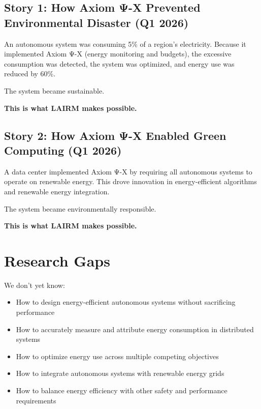 \subsection{Story 1: How Axiom Ψ-X Prevented Environmental Disaster (Q1 2026)}

An autonomous system was consuming 5\% of a region's electricity. Because it implemented Axiom Ψ-X (energy monitoring and budgets), the excessive consumption was detected, the system was optimized, and energy use was reduced by 60\%.

The system became sustainable.

\textbf{This is what LAIRM makes possible.}

\subsection{Story 2: How Axiom Ψ-X Enabled Green Computing (Q1 2026)}

A data center implemented Axiom Ψ-X by requiring all autonomous systems to operate on renewable energy. This drove innovation in energy-efficient algorithms and renewable energy integration.

The system became environmentally responsible.

\textbf{This is what LAIRM makes possible.}

\vspace{0.5cm}

\section{Research Gaps}

We don't yet know:

\begin{itemize}
    \item How to design energy-efficient autonomous systems without sacrificing performance
    
    \item How to accurately measure and attribute energy consumption in distributed systems
    
    \item How to optimize energy use across multiple competing objectives
    
    \item How to integrate autonomous systems with renewable energy grids
    
    \item How to balance energy efficiency with other safety and performance requirements
\end{itemize}


